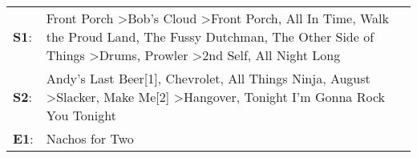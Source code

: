 \begin{supertabular}{p{0.03\textwidth}p{0.92\textwidth}}
 \textbf{S1}:  &  Front Porch\textsuperscript{} \textgreater \enspace Bob's Cloud\textsuperscript{} \textgreater \enspace Front Porch\textsuperscript{}, \enspace All In Time\textsuperscript{}, \enspace Walk the Proud Land\textsuperscript{}, \enspace The Fussy Dutchman\textsuperscript{}, \enspace The Other Side of Things\textsuperscript{} \textgreater \enspace Drums\textsuperscript{}, \enspace Prowler\textsuperscript{} \textgreater \enspace 2nd Self\textsuperscript{}, \enspace All Night Long\textsuperscript{}  \enspace  \\
 \textbf{S2}:  &                                                                                                                                               Andy's Last Beer[1]\textsuperscript{}, \enspace Chevrolet\textsuperscript{}, \enspace All Things Ninja\textsuperscript{}, \enspace August\textsuperscript{} \textgreater \enspace Slacker\textsuperscript{}, \enspace Make Me[2]\textsuperscript{} \textgreater \enspace Hangover\textsuperscript{}, \enspace Tonight I'm Gonna Rock You Tonight\textsuperscript{}  \enspace  \\
 \textbf{E1}:  &                                                                                                                                                                                                                                                                                                                                                                                                                                                                                 Nachos for Two\textsuperscript{}  \enspace  \\
\end{supertabular}
